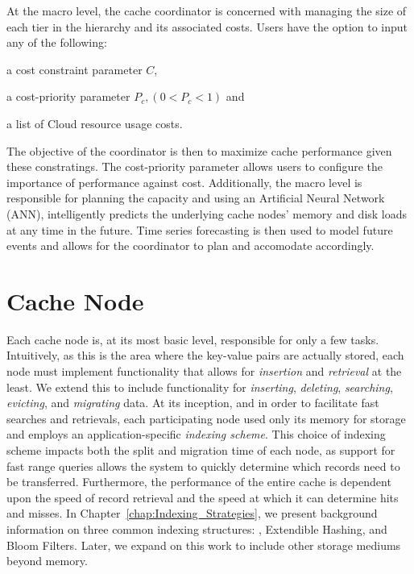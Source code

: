 At the macro level, the cache coordinator is concerned with managing the size
of each tier in the hierarchy and its associated costs. Users have the option
to input any of the following:
\begin{inparaenum}[(1)]
  \item a cost constraint parameter $C$,
  \item a cost-priority parameter $P_c, (0 < P_c < 1)$ and
  \item a list of Cloud resource usage costs.
\end{inparaenum}
The objective of the coordinator is then to maximize cache performance given
these constratings. The cost-priority parameter allows users to configure the
importance of performance against cost. Additionally, the macro level is
responsible for planning the capacity and using an Artificial Neural Network
(ANN), intelligently predicts the underlying cache nodes' memory and disk loads
at any time in the future. Time series forecasting is then used to model future
events and allows for the coordinator to plan and accomodate accordingly.


\section{Cache Node} %
\label{sec:Cache_Node}
Each cache node is, at its most basic level, responsible for only a few tasks.
Intuitively, as this is the area where the key-value pairs are actually stored,
each node must implement functionality that allows for \emph{insertion} and
\emph{retrieval} at the least. We extend this to include functionality for
\emph{inserting}, \emph{deleting}, \emph{searching}, \emph{evicting}, and
\emph{migrating} data. At its inception, and in order to facilitate fast
searches and retrievals, each participating node used only its memory for
storage and employs an application-specific \emph{indexing scheme}. This choice
of indexing scheme impacts both the split and migration time of each node, as
support for fast range queries allows the system to quickly determine which
records need to be transferred. Furthermore, the performance of the entire
cache is dependent upon the speed of record retrieval and the speed at which it
can determine hits and misses. In Chapter~\ref{chap:Indexing_Strategies}, we
present background information on three common indexing structures:
\bptrees, Extendible Hashing, and Bloom Filters. Later, we expand on this
work to include other storage mediums beyond memory.

